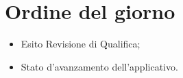 \section{Ordine del giorno}
\begin{itemize}
\item Esito Revisione di Qualifica;
\item Stato d'avanzamento dell'applicativo.
\end{itemize}